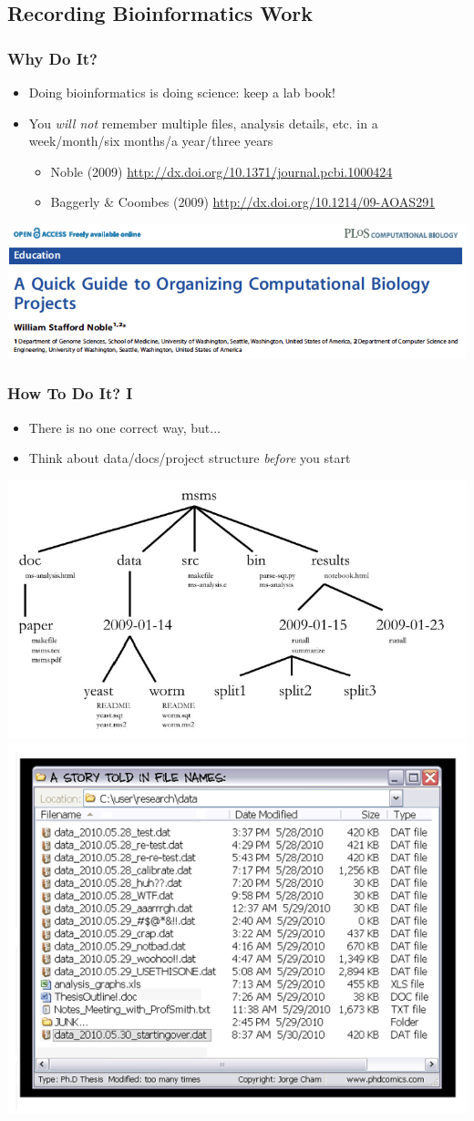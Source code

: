 %

\subsection{Recording Bioinformatics Work}
\begin{frame}
  \frametitle{Why Do It?}
  \begin{itemize}
    \item Doing bioinformatics is doing science: keep a lab book!
    \item You \emph{will not} remember multiple files, analysis details, etc. in a week/month/six months/a year/three years
    \begin{itemize}
      \item Noble (2009) \url{http://dx.doi.org/10.1371/journal.pcbi.1000424}
      \item Baggerly \& Coombes (2009) \url{http://dx.doi.org/10.1214/09-AOAS291}
    \end{itemize}
  \end{itemize}
  \includegraphics[width=.6\textwidth]{images/noble_2009_head}
\end{frame}
   
\begin{frame}
  \frametitle{How To Do It? I}
  \begin{itemize}
    \item There is no one correct way, but$\ldots$
    \item Think about data/docs/project structure \textit{before} you start
  \end{itemize}
  \begin{center}
    \includegraphics[width=.5\textwidth]{images/project_structure}
    \includegraphics[width=.5\textwidth]{images/phd052810s}
  \end{center}
\end{frame}

